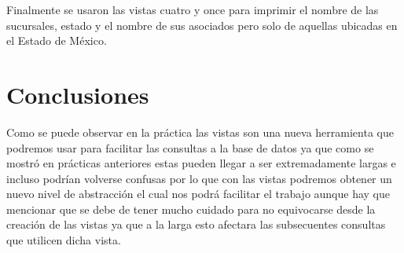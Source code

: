 \documentclass[12pt, titlepage]{article}
\begin{document}
	Finalmente se usaron las vistas cuatro y once para imprimir el nombre de las sucursales, estado y el nombre de sus asociados pero solo de aquellas ubicadas en el Estado de México.
	
	
	\section{Conclusiones}
	Como se puede observar en la práctica las vistas son una nueva herramienta que podremos usar para facilitar las consultas a la base de datos ya que como se mostró en prácticas anteriores estas pueden llegar a ser extremadamente largas e incluso podrían volverse confusas por lo que con las vistas podremos obtener un nuevo nivel de abstracción el cual nos podrá facilitar el trabajo aunque hay que mencionar que se debe de tener mucho cuidado para no equivocarse desde la creación de las vistas ya que a la larga esto afectara las subsecuentes consultas que utilicen dicha vista.
	 
	
\end{document}
